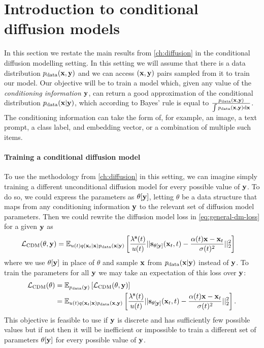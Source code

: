 \section{Introduction to conditional diffusion models} \label{sec:conditional-diffusion-overview}

In this section we restate the main results from \cref{ch:diffusion} in the conditional diffusion modelling setting. In this setting we will assume that there is a data distribution $p_\text{data}({\mathbf{x}}, {\mathbf{y}})$ and we can access $({\mathbf{x}}, {\mathbf{y}})$ pairs sampled from it to train our model. Our objective will be to train a model which, given any value of the \textit{conditioning information} ${\mathbf{y}}$, can return a good approximation of the conditional distribution $p_\text{data}({\mathbf{x}}|{\mathbf{y}})$, which according to Bayes' rule is equal to $\frac{p_\text{data}({\mathbf{x}},{\mathbf{y}})}{\int p_\text{data}({\mathbf{x}},{\mathbf{y}}) \mathrm{d}{\mathbf{x}}}$. The conditioning information can take the form of, for example, an image, a text prompt, a class label, and embedding vector, or a combination of multiple such items.

\paragraph{Training a conditional diffusion model}
To use the methodology from \cref{ch:diffusion} in this setting, we can imagine simply training a different unconditional diffusion model for every possible value of ${\mathbf{y}}$. To do so, we could express the parameters as $\theta[{\mathbf{y}}]$, letting $\theta$ be a data structure that maps from any conditioning information ${\mathbf{y}}$ to the relevant set of diffusion model parameters. Then we could rewrite the diffusion model loss in \cref{eq:general-dm-loss} for a given ${\mathbf{y}}$ as
\begin{align} \label{eq:cond-diffusion-loss-single-y}
    {\mathcal{L}}_\text{CDM}(\theta, {\mathbf{y}}) &= \mathbb{E}_{u(t)q({\mathbf{x}}_t|{\mathbf{x}})p_{\rm{data}}({\mathbf{x}}|{\mathbf{y}})} \left[ \frac{\lambda^{\mathbf{s}}(t)}{u(t)} 
    || {\mathbf{s}}_{\theta[{\mathbf{y}}]}({\mathbf{x}}_t, t) - \frac{\alpha(t){\mathbf{x}}-{\mathbf{x}}_t}{\sigma(t)^2} ||_2^2 \right]
\end{align}
where we use $\theta[{\mathbf{y}}]$ in place of $\theta$ and sample ${\mathbf{x}}$ from $p_{\rm{data}}({\mathbf{x}}|{\mathbf{y}})$ instead of ${\mathbf{y}}$. To train the parameters for all ${\mathbf{y}}$ we may take an expectation of this loss over ${\mathbf{y}}$:
\begin{align} \label{eq:cond-exp-diffusion-loss-all-sigma}
    {\mathcal{L}}_\text{CDM}(\theta) &= \mathbb{E}_{p_{\rm{data}}({\mathbf{y}})} \left[ {\mathcal{L}}_\text{CDM}(\theta, {\mathbf{y}}) \right] \\
    &= \mathbb{E}_{u(t)q({\mathbf{x}}_t|{\mathbf{x}})p_{\rm{data}}({\mathbf{x}}, {\mathbf{y}})} \left[ \frac{\lambda^{\mathbf{s}}(t)}{u(t)} 
    || {\mathbf{s}}_{\theta[{\mathbf{y}}]}({\mathbf{x}}_t, t) - \frac{\alpha(t){\mathbf{x}}-{\mathbf{x}}_t}{\sigma(t)^2} ||_2^2 \right].
\end{align}
This objective is feasible to use if ${\mathbf{y}}$ is discrete and has sufficiently few possible values but if not then it will be inefficient or impossible to train a different set of parameters $\theta[{\mathbf{y}}]$ for every possible value of ${\mathbf{y}}$.

